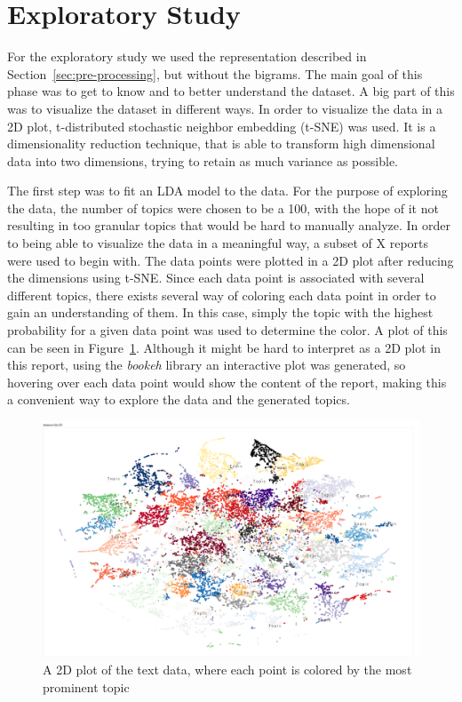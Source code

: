 \section{Exploratory Study}\label{sec:exploratory-study}
For the exploratory study we used the representation described in Section~\ref{sec:pre-processing}, but without the bigrams.
The main goal of this phase was to get to know and to better understand the dataset.
A big part of this was to visualize the dataset in different ways.
In order to visualize the data in a 2D plot, t-distributed stochastic neighbor embedding (t-SNE) was used.
It is a dimensionality reduction technique, that is able to transform high dimensional data into two dimensions, trying to retain as much variance as possible.

The first step was to fit an LDA model to the data.
For the purpose of exploring the data, the number of topics were chosen to be a 100, with the hope of it not resulting in too granular topics that would be hard to manually analyze. %
In order to being able to visualize the data in a meaningful way, a subset of X reports were used to begin with.
The data points were plotted in a 2D plot after reducing the dimensions using t-SNE.
Since each data point is associated with several different topics, there exists several way of coloring each data point in order to gain an understanding of them.
In this case, simply the topic with the highest probability for a given data point was used to determine the color.
A plot of this can be seen in Figure~\ref{fig:lda-dist}.
Although it might be hard to interpret as a 2D plot in this report, using the \textit{bookeh} library an interactive plot was generated, so hovering over each data point would show the content of the report, making this a convenient way to explore the data and the generated topics.

\begin{figure}
    \centering
    \includegraphics[scale=0.25]{figures/lda-2d-distribution.png}
    \caption{A 2D plot of the text data, where each point is colored by the most prominent topic}
    \label{fig:lda-dist}
\end{figure}


